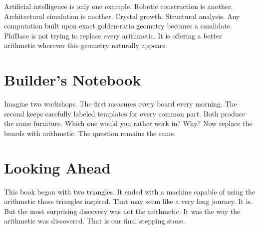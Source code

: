 Artificial intelligence is only one example. Robotic construction is another. Architectural simulation is another. Crystal growth. Structural analysis. Any computation built upon exact golden-ratio geometry becomes a candidate. PhiBase is not trying to replace every arithmetic. It is offering a better arithmetic wherever this geometry naturally appears.

\section*{Builder's Notebook}

Imagine two workshops. The first measures every board every morning. The second keeps carefully labeled templates for every common part. Both produce the same furniture. Which one would you rather work in? Why? Now replace the boards with arithmetic. The question remains the same.

\section*{Looking Ahead}

This book began with two triangles. It ended with a machine capable of using the arithmetic those triangles inspired. That may seem like a very long journey. It is. But the most surprising discovery was not the arithmetic. It was the way the arithmetic was discovered. That is our final stepping stone.
